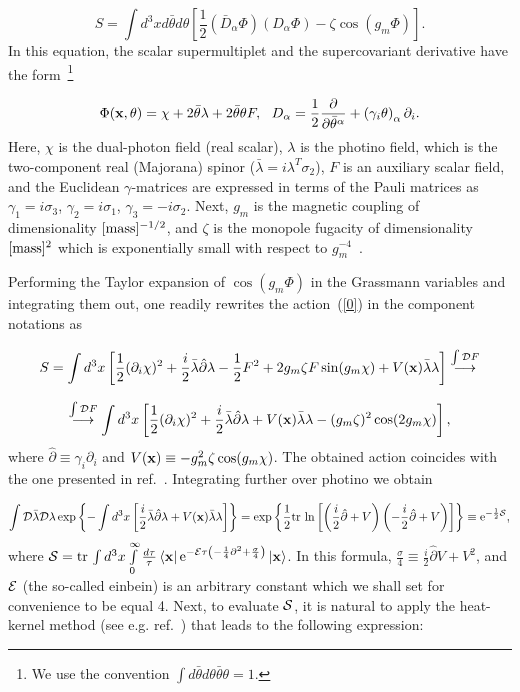 \documentclass[a4paper,12pt]{article}
\begin{document}
\begin{equation}
\label{0}
S=\int d^3xd\bar\theta d\theta\left[\frac12(\bar D_\alpha\Phi)(D_\alpha\Phi)-\zeta\cos\left(g_m\Phi\right)\right].
\end{equation}
In this equation, the scalar supermultiplet and
the supercovariant derivative have the form~\footnote{We use the convention $\int d\bar\theta d\theta\bar\theta\theta=1$.}

$$\Phi({\bf x},\theta)=\chi+2\bar\theta\lambda+2\bar\theta\theta F,~~
D_\alpha=\frac12\frac{\partial}{\partial\bar\theta^\alpha}+\left(\gamma_i\theta\right)_\alpha\partial_i.$$
Here, $\chi$ is the dual-photon field (real scalar), $\lambda$ is the photino field,
which is the two-component real (Majorana) spinor ($\bar\lambda=i\lambda^T\sigma_2$),
$F$ is an auxiliary scalar field, and the Euclidean $\gamma$-matrices are
expressed in terms of the Pauli matrices as $\gamma_1=i\sigma_3$, $\gamma_2=i\sigma_1$, $\gamma_3=-i\sigma_2$.
Next, $g_m$ is the magnetic coupling of dimensionality $[{\rm mass}]^{-1/2}$,
and $\zeta$ is the monopole fugacity of dimensionality $[{\rm mass}]^{2}$ which is
exponentially small with respect to $g_m^{-4}$~\cite{1, ahw}.

Performing the Taylor expansion of $\cos\left(g_m\Phi\right)$ in the Grassmann variables and integrating them out, one
readily rewrites the action~(\ref{0}) in the component notations as

$$S=\int d^3x\left[\frac12(\partial_i\chi)^2+\frac{i}{2}\bar\lambda\hat\partial\lambda-\frac12F^2+2g_m\zeta F\sin(g_m\chi)+
V({\bf x})\bar\lambda\lambda\right]\stackrel{\int{\cal D}F}{\longrightarrow}$$

$$
\stackrel{\int{\cal D}F}{\longrightarrow}
\int d^3x\left[\frac12(\partial_i\chi)^2+\frac{i}{2}\bar\lambda\hat\partial\lambda+V({\bf x})\bar\lambda\lambda-
(g_m\zeta)^2\cos(2g_m\chi)\right],
$$
where $\hat\partial\equiv\gamma_i\partial_i$ and $V({\bf x})\equiv -g_m^2\zeta\cos(g_m\chi)$. The obtained action
coincides with the one presented in ref.~\cite{ahw}. Integrating further over photino we obtain

$$\int {\cal D}\bar\lambda{\cal D}\lambda\exp
\left\{-\int d^3x\left[\frac{i}{2}\bar\lambda\hat\partial\lambda+V({\bf x})\bar\lambda\lambda
\right]\right\}=\exp\left\{\frac12{\rm tr}{\,}\ln\left[\left(\frac{i}{2}\hat\partial+V\right)\left(-\frac{i}{2}\hat\partial+V\right)
\right]\right\}\equiv{\rm e}^{-\frac12{\cal S}},$$
where
${\cal S}={\rm tr}{\,}\int d^3x\int\limits_{0}^{\infty}\frac{d\tau}{\tau}\left<{\bf x}\right|{\rm e}^{-{\cal E}\tau\left(
-\frac14\partial^2+\frac{\sigma}{4}\right)}\left|{\bf x}\right>$. In this formula,
$\frac{\sigma}{4}\equiv\frac{i}{2}\hat\partial V+V^2$, and ${\cal E}$ (the so-called einbein) is an arbitrary constant
which we shall set for convenience to be equal 4. Next, to evaluate ${\cal S}$, it is natural to apply the heat-kernel method
(see e.g. ref.~\cite{book}) that leads to the following expression:
\end{document}
